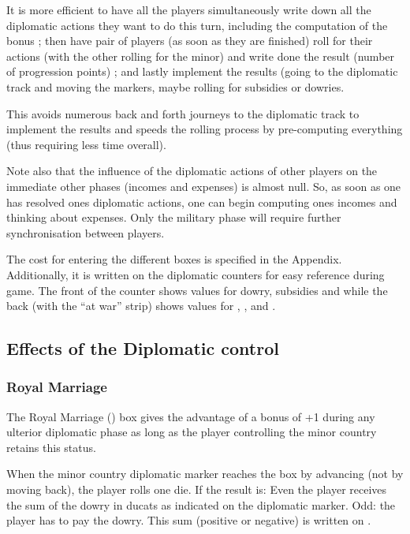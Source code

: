 \begin{playtip}
  It is more efficient to have all the players simultaneously write down all
  the diplomatic actions they want to do this turn, including the computation
  of the bonus ; then have pair of players (as soon as they are finished) roll
  for their actions (with the other rolling for the minor) and write done the
  result (number of progression points) ; and lastly implement the results
  (going to the diplomatic track and moving the markers, maybe rolling for
  subsidies or dowries.

  This avoids numerous back and forth journeys to the diplomatic track to
  implement the results and speeds the rolling process by pre-computing
  everything (thus requiring less time overall).

  Note also that the influence of the diplomatic actions of other players on
  the immediate other phases (incomes and expenses) is almost null. So, as
  soon as one has resolved ones diplomatic actions, one can begin computing
  ones incomes and thinking about expenses. Only the military phase will
  require further synchronisation between players.
\end{playtip}

 The cost for entering the different boxes is
specified in the Appendix. Additionally, it is written on the diplomatic
counters for easy reference during game. The front of the counter shows values
for dowry, subsidies and \MA while the back (with the ``at war'' strip) shows
values for \EC, \EW, \VASSAL and \ANNEXION.



\subsection{Effects of the Diplomatic control}


\subsubsection{Royal Marriage}
\aparag The Royal Marriage (\MR) box gives the advantage of a bonus of +1
during any ulterior diplomatic phase as long as the player controlling the
minor country retains this status.

 When the minor country diplomatic marker reaches the \MR
box by advancing (not by moving back), the player rolls one die. If the result
is:
\bparag Even the player receives the sum of the dowry in ducats as indicated
on the diplomatic marker.
\bparag Odd: the player has to pay the dowry.
\aparag This sum (positive or negative) is written on .


